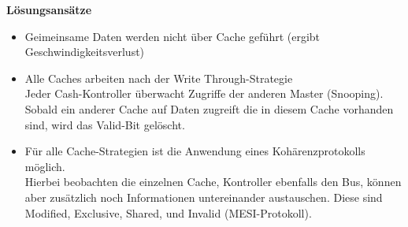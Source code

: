 \textbf{Lösungsansätze}
\begin{itemize}[noitemsep,topsep=0pt]
	\item Geimeinsame Daten werden nicht über Cache geführt (ergibt Geschwindigkeitsverlust)
	\item Alle Caches arbeiten nach der Write Through-Strategie\\
	Jeder Cash-Kontroller überwacht Zugriffe der anderen Master (Snooping). Sobald ein anderer Cache auf Daten zugreift die in diesem Cache vorhanden sind, wird das Valid-Bit gelöscht.
	\item Für alle Cache-Strategien ist die Anwendung eines Kohärenzprotokolls möglich.\\
	Hierbei beobachten die einzelnen Cache, Kontroller ebenfalls den Bus, können aber zusätzlich noch Informationen untereinander austauschen. Diese sind Modified, Exclusive, Shared, und Invalid (MESI-Protokoll).
\end{itemize}
